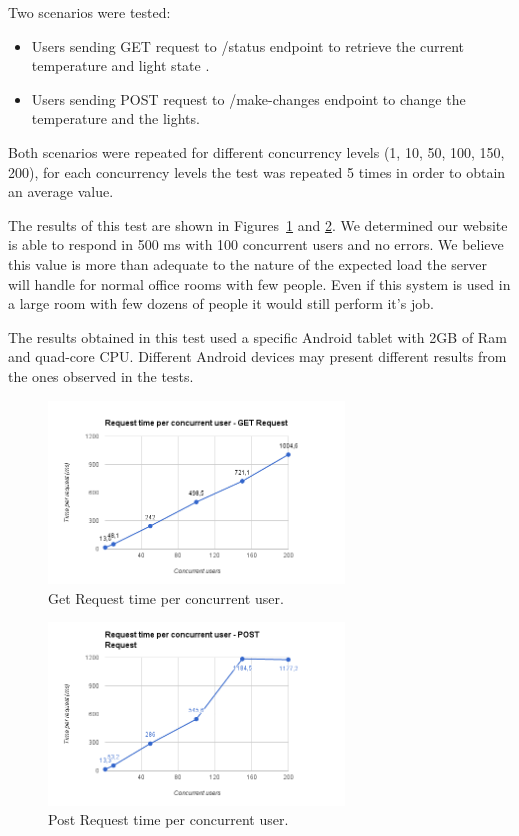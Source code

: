 Two scenarios were tested:
\begin{itemize}
  \item Users sending GET request to /status endpoint to retrieve the current temperature and light state .
  \item Users sending POST request to /make-changes endpoint to change the temperature and the lights.
\end{itemize} 

Both scenarios were repeated for different concurrency levels (1, 10, 50, 100, 150, 200), for each concurrency levels the test was repeated 5 times in order to obtain an average value. 

The results of this test are shown in Figures~\ref{eval:server1} and \ref{eval:server2}. We determined our website is able to respond in 500 ms with 100 concurrent users and no errors. We believe this value is more than adequate to the nature of the expected load the server will handle for normal office rooms with few people. Even if this system is used in a large room with few dozens of people it would still perform it's job.


The results obtained in this test used a specific Android tablet with 2GB of Ram and quad-core CPU. Different Android devices may present different results from the ones observed in the tests. 

\begin{figure}[H]
\centering
\includegraphics[width=0.7\textwidth]{Figures/bench_get}
\caption{Get Request time per concurrent user.}
\label{eval:server1}
\end{figure}

\begin{figure}[H]
\centering
\includegraphics[width=0.7\textwidth]{Figures/bench_post}
\caption{Post Request time per concurrent user.}
\label{eval:server2}
\end{figure}





